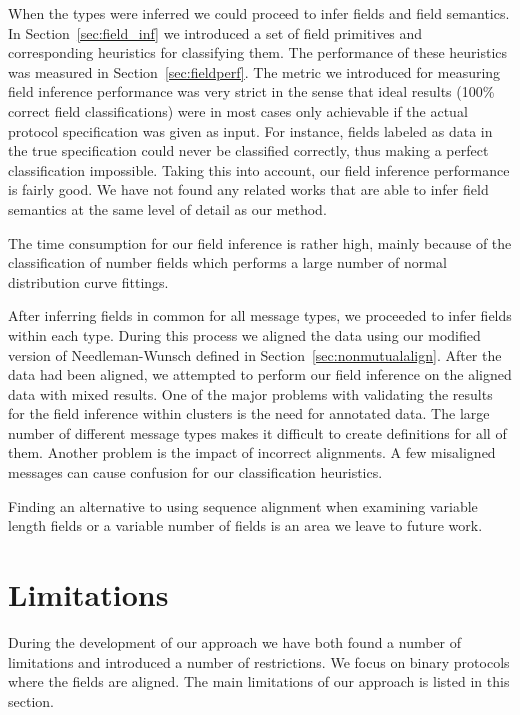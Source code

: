 \documentclass[a4paper]{report}
\begin{document}
When the types were inferred we could proceed to infer fields and field
semantics. In Section~\ref{sec:field_inf} we introduced a set of
field primitives and corresponding heuristics for classifying them. The
performance of these heuristics was measured in Section~\ref{sec:fieldperf}.
The metric we introduced for measuring field inference performance was very
strict in the sense that ideal results (100\% correct field classifications)
were in most cases only achievable if the actual protocol specification was
given as input. For instance, fields labeled as data in the true specification
could never be classified correctly, thus making a perfect classification
impossible. Taking this into account, our field inference performance is
fairly good. We have not found any related works that are able to infer field
semantics at the same level of detail as our method.

The time consumption for our field inference is rather high, mainly because
of the classification of number fields which performs a large number of normal
distribution curve fittings.

After inferring fields in common for all message types, we proceeded to
infer fields within each type. During this process we aligned the data using
our modified version of Needleman-Wunsch defined in
Section~\ref{sec:nonmutualalign}. After the data had been aligned, we attempted
to perform our field inference on the aligned data with mixed results. One
of the major problems with validating the results for the field inference
within clusters is the need for annotated data. The large number of different
message types makes it difficult to create definitions for all of them. Another
problem is the impact of incorrect alignments. A few misaligned messages can
cause confusion for our classification heuristics.

Finding an alternative to using sequence alignment when examining variable
length fields or a variable number of fields is an area we leave to future work.

\section{Limitations}
During the development of our approach we have both found a number of
limitations and introduced a number of restrictions. We focus on binary
protocols where the fields are aligned. The main limitations of our approach
is listed in this section.
\end{document}
